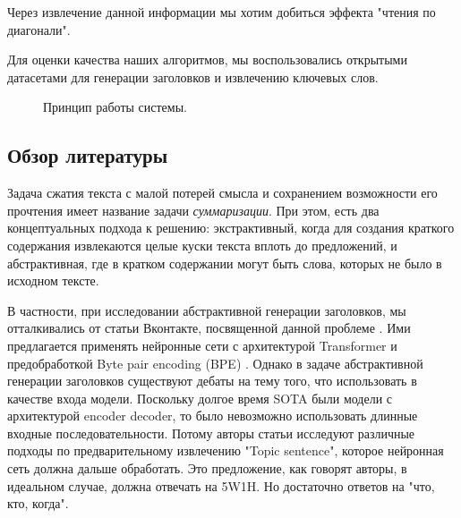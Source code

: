 \documentclass[aps,%
12pt,%
final,%
oneside,
onecolumn,%
musixtex, %
superscriptaddress,%
centertags]{article} %
\begin{document}
Через извлечение данной информации мы хотим добиться эффекта "чтения по диагонали".

Для оценки качества наших алгоритмов, мы воспользовались открытыми датасетами для генерации заголовков и извлечению ключевых слов.

\begin{figure}[ht]
\begin{center}


\caption{
\label{app_story} Принцип работы системы.
        }
\end {center}
\end {figure}

\subsection{Обзор литературы}
Задача сжатия текста с малой потерей смысла и сохранением возможности его прочтения
имеет название задачи \textit{суммаризации}. При этом, есть два концептуальных подхода к решению:
экстрактивный, когда для создания краткого содержания извлекаются целые куски текста вплоть до предложений,
и абстрактивная, где в кратком содержании могут быть слова, которых не было в исходном тексте.

В частности, при исследовании абстрактивной генерации заголовков, мы отталкивались от статьи Вконтакте, посвященной данной проблеме \cite{gavrilov2018self}. Ими предлагается применять нейронные сети с архитектурой Transformer и предобработкой Byte pair encoding (BPE) \cite{DBLP:journals/corr/SennrichHB15}. Однако в задаче абстрактивной генерации заголовков существуют дебаты на тему того, что использовать в качестве входа модели. Поскольку долгое время SOTA были модели с архитектурой encoder decoder, то было невозможно использовать длинные входные последовательности. Потому авторы статьи \cite{Putra2018IncorporatingTS} исследуют различные подходы по предварительному извлечению "Topic sentence", которое нейронная сеть должна дальше обработать. Это предложение, как говорят авторы, в идеальном случае, должна отвечать на 5W1H. Но достаточно ответов на "что, кто, когда".
\end{document}
